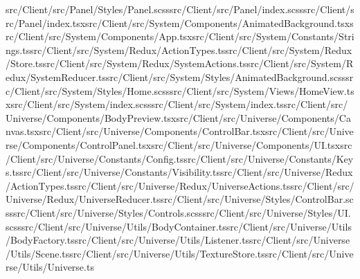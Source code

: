 \documentclass[a4paper,12pt]{article}
\begin{document}
src/Client/src/Panel/Styles/Panel.scss\newline src/Client/src/Panel/index.scss\newline src/Client/src/Panel/index.tsx\newline src/Client/src/System/Components/AnimatedBackground.tsx\newline src/Client/src/System/Components/App.tsx\newline src/Client/src/System/Constants/Strings.ts\newline src/Client/src/System/Redux/ActionTypes.ts\newline src/Client/src/System/Redux/Store.ts\newline src/Client/src/System/Redux/SystemActions.ts\newline src/Client/src/System/Redux/SystemReducer.ts\newline src/Client/src/System/Styles/AnimatedBackground.scss\newline src/Client/src/System/Styles/Home.scss\newline src/Client/src/System/Views/HomeView.tsx\newline src/Client/src/System/index.scss\newline src/Client/src/System/index.ts\newline src/Client/src/Universe/Components/BodyPreview.tsx\newline src/Client/src/Universe/Components/Canvas.tsx\newline src/Client/src/Universe/Components/ControlBar.tsx\newline src/Client/src/Universe/Components/ControlPanel.tsx\newline src/Client/src/Universe/Components/UI.tsx\newline src/Client/src/Universe/Constants/Config.ts\newline src/Client/src/Universe/Constants/Keys.ts\newline src/Client/src/Universe/Constants/Visibility.ts\newline src/Client/src/Universe/Redux/ActionTypes.ts\newline src/Client/src/Universe/Redux/UniverseActions.ts\newline src/Client/src/Universe/Redux/UniverseReducer.ts\newline src/Client/src/Universe/Styles/ControlBar.scss\newline src/Client/src/Universe/Styles/Controls.scss\newline src/Client/src/Universe/Styles/UI.scss\newline src/Client/src/Universe/Utils/BodyContainer.ts\newline src/Client/src/Universe/Utils/BodyFactory.ts\newline src/Client/src/Universe/Utils/Listener.ts\newline src/Client/src/Universe/Utils/Scene.ts\newline src/Client/src/Universe/Utils/TextureStore.ts\newline src/Client/src/Universe/Utils/Universe.ts\newline 
\end{document}
